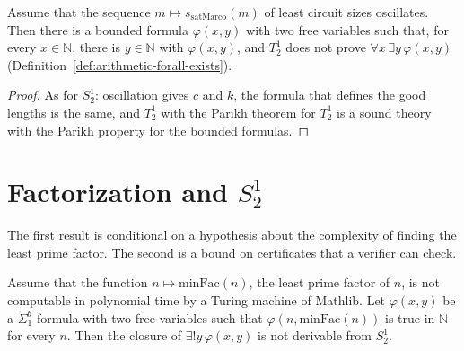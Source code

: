 \begin{theorem}
  \label{thm:arithmetic-t12-oscillation}
  \leanok
  Assume that the sequence $m \mapsto s_{\mathrm{satMarco}}(m)$ of least circuit sizes oscillates.
  Then there is a bounded formula $\varphi(x, y)$ with two free variables such that, for every $x \in
  \mathbb{N}$, there is $y \in \mathbb{N}$ with $\varphi(x, y)$, and $T^1_2$ does not prove $\forall x\,
  \exists y\, \varphi(x, y)$ (Definition~\ref{def:arithmetic-forall-exists}).
\end{theorem}

\begin{proof}
  \leanok
  As for $S^1_2$: oscillation gives $c$ and $k$, the formula that defines the good lengths is the same,
  and $T^1_2$ with the Parikh theorem for $T^1_2$ is a sound theory with the Parikh property for the
  bounded formulas.
\end{proof}

\section{Factorization and $S^1_2$}
\label{sec:arithmetic-factor}

The first result is conditional on a hypothesis about the complexity of finding the least prime
factor. The second is a bound on certificates that a verifier can check.

\begin{theorem}
  \label{thm:arithmetic-no-factor}
  \leanok
  Assume that the function $n \mapsto \mathrm{minFac}(n)$, the least prime factor of $n$, is not
  computable in polynomial time by a Turing machine of Mathlib. Let $\varphi(x, y)$ be a $\Sigma^b_1$
  formula with two free variables such that $\varphi(n, \mathrm{minFac}(n))$ is true in $\mathbb{N}$
  for every $n$. Then the closure of $\exists! y\, \varphi(x, y)$ is not derivable from $S^1_2$.
  \own{}
\end{theorem}


